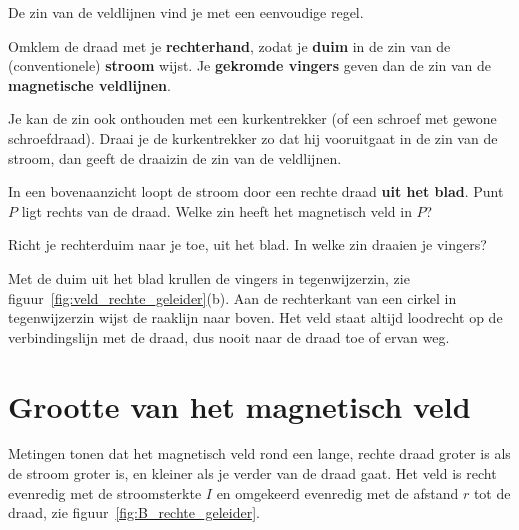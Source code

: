 \documentclass{ximera}
\begin{document}
De zin van de veldlijnen vind je met een eenvoudige regel.

\begin{proposition}[foldable=true,title={Rechterhandregel voor een rechte geleider}]\nl
    Omklem de draad met je \textbf{rechterhand}, zodat je \textbf{duim} in de zin van de (conventionele) \textbf{stroom} wijst. Je \textbf{gekromde vingers} geven dan de zin van de \textbf{magnetische veldlijnen}.
\end{proposition}

\begin{remark}[expandable=true,title={Kurkentrekkerregel}]\nl
    Je kan de zin ook onthouden met een kurkentrekker (of een schroef met gewone schroefdraad). Draai je de kurkentrekker zo dat hij vooruitgaat in de zin van de stroom, dan geeft de draaizin de zin van de veldlijnen.
\end{remark}

\begin{question}
    In een bovenaanzicht loopt de stroom door een rechte draad \textbf{uit het blad}. Punt $P$ ligt rechts van de draad. Welke zin heeft het magnetisch veld in $P$?

    \begin{multipleChoice}
    \end{multipleChoice}

    \begin{hint}
        Richt je rechterduim naar je toe, uit het blad. In welke zin draaien je vingers?
    \end{hint}

    \begin{solution}\nl
        Met de duim uit het blad krullen de vingers in tegenwijzerzin, zie figuur~\ref{fig:veld_rechte_geleider}(b). Aan de rechterkant van een cirkel in tegenwijzerzin wijst de raaklijn naar boven. Het veld staat altijd loodrecht op de verbindingslijn met de draad, dus nooit naar de draad toe of ervan weg.
    \end{solution}
\end{question}

\section{Grootte van het magnetisch veld}\label{sec:grootte-B-rechte-geleider}
Metingen tonen dat het magnetisch veld rond een lange, rechte draad groter is als de stroom groter is, en kleiner als je verder van de draad gaat. Het veld is recht evenredig met de stroomsterkte $I$ en omgekeerd evenredig met de afstand $r$ tot de draad, zie figuur~\ref{fig:B_rechte_geleider}.
\end{document}
